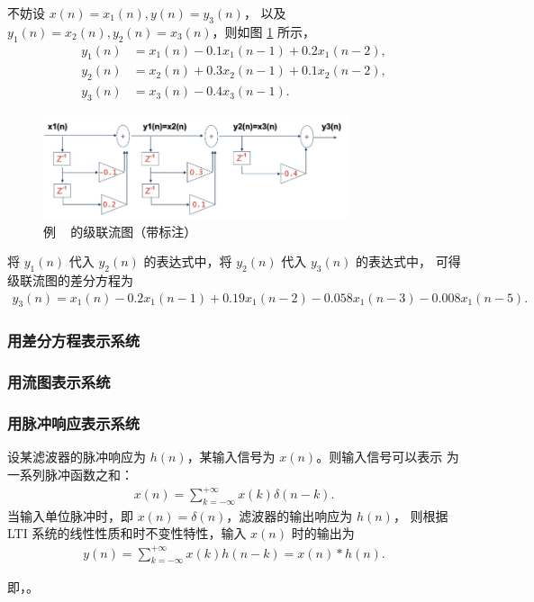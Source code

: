 \begin{solution}
    不妨设 $x(n) = x_1(n), y(n) = y_3(n)$，
    以及 $y_1(n) = x_2(n), y_2(n) = x_3(n)$，则如图 \ref{fig:serial-flow-chart-annotated} 所示，
    \begin{align*}
        y_1(n) & = x_1(n) - 0.1x_1(n - 1) + 0.2x_1(n - 2), \\
        y_2(n) & = x_2(n) + 0.3x_2(n - 1) + 0.1x_2(n - 2), \\
        y_3(n) & = x_3(n) - 0.4x_3(n - 1).
    \end{align*}
    \begin{figure}[H]
        \centering
        \includegraphics[width=0.8\textwidth]{chap4/img/serial_flow_chart_annotated.png}
        \caption{例 \theexample~ 的级联流图（带标注）}
        \label{fig:serial-flow-chart-annotated}
    \end{figure}
    将 $y_1(n)$ 代入 $y_2(n)$ 的表达式中，将 $y_2(n)$ 代入 $y_3(n)$ 的表达式中，
    可得级联流图的差分方程为
    \begin{align*}
        y_3(n) = x_1(n) - 0.2x_1(n - 1) + 0.19x_1(n - 2) - 0.058x_1(n - 3) - 0.008x_1(n - 5).
    \end{align*}
\end{solution}


\subsubsection{用差分方程表示系统}

\subsubsection{用流图表示系统}

\subsubsection{用脉冲响应表示系统}

\begin{theorem}
    设某滤波器的脉冲响应为 $h(n)$，某输入信号为 $x(n)$。则输入信号可以表示
    为一系列脉冲函数之和：
    \begin{align*}
        x(n) = \sum_{k = -\infty}^{+\infty}x(k)\delta(n - k).
    \end{align*}
    当输入单位脉冲时，即 $x(n) = \delta(n)$，滤波器的输出响应为 $h(n)$，
    则根据 LTI 系统的线性性质和时不变性特性，输入 $x(n)$ 时的输出为
    \begin{align*}
        y(n) = \sum_{k = -\infty}^{+\infty}x(k)h(n - k) = x(n) * h(n).
    \end{align*}
    
    即，。
\end{theorem}

